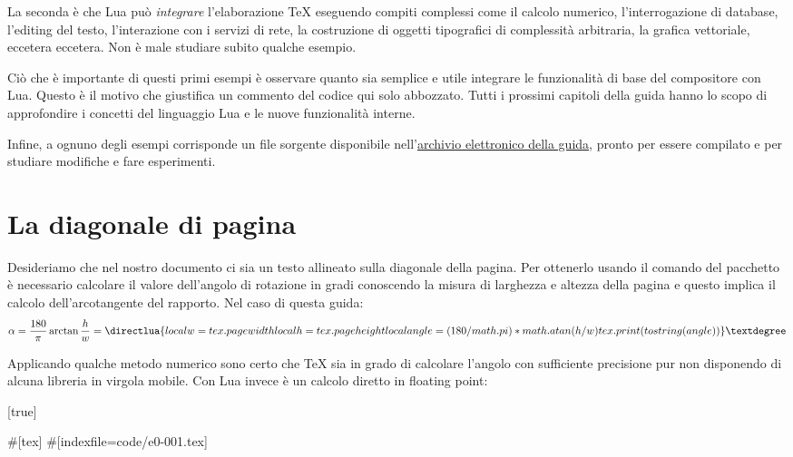 La seconda è che Lua può \emph{integrare} l'elaborazione \TeX{} eseguendo
compiti complessi come il calcolo numerico, l'interrogazione di database,
l'editing del testo, l'interazione con i servizi di rete, la costruzione di
oggetti tipografici di complessità arbitraria, la grafica vettoriale, eccetera
eccetera. Non è male studiare subito qualche esempio.

Ciò che è importante di questi primi esempi è osservare quanto sia semplice e
utile integrare le funzionalità di base del compositore con Lua. Questo è il
motivo che giustifica un commento del codice qui solo abbozzato. Tutti i
prossimi capitoli della guida hanno lo scopo di approfondire i concetti del
linguaggio Lua e le nuove funzionalità interne.

Infine, a ognuno degli esempi corrisponde un file sorgente disponibile
nell'\href{https://github.com/GuITeX/guidalua}{archivio elettronico della
guida}, pronto per essere compilato e per studiare modifiche e fare esperimenti.


\section{La diagonale di pagina}

Desideriamo che nel nostro documento ci sia un testo allineato sulla diagonale
della pagina. Per ottenerlo usando il comando  del pacchetto
 è necessario calcolare il valore dell'angolo di rotazione in
gradi conoscendo la misura di larghezza e altezza della pagina e questo implica
il calcolo dell'arcotangente del rapporto. Nel caso di questa guida:
\[
    \alpha = \frac{180}{\pi}\arctan{\frac{h}{w}} = \directlua{
        local w = tex.pagewidth
        local h = tex.pageheight
        local angle = (180/math.pi) * math.atan(h/w)
        tex.print(tostring(angle))
    }°
\]

Applicando qualche metodo numerico sono certo che \TeX{} sia in grado di
calcolare l'angolo con sufficiente precisione pur non disponendo di alcuna
libreria in virgola mobile. Con Lua invece è un calcolo diretto in floating
point:

[true]%
%
%
%
\begin{lines}
#[tex]
#[indexfile=code/e0-001.tex]
\end{lines}

